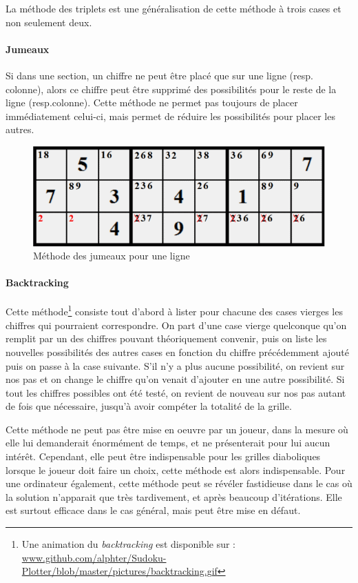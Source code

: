 \documentclass[12pt,a4paper]{report}
\begin{document}
La méthode des triplets est une généralisation de cette méthode à trois cases et non seulement deux.

\paragraph{Jumeaux} Si dans une section, un chiffre ne peut être placé que sur une ligne (resp. colonne), alors ce chiffre peut être supprimé des possibilités pour le reste de la ligne (resp.colonne). Cette méthode ne permet pas toujours de placer immédiatement celui-ci, mais permet de réduire les possibilités pour placer les autres.
\begin{figure}[!h]
 \center
 \includegraphics[scale=0.6]{../pictures/jumeaux}
 \caption{Méthode des jumeaux pour une ligne}
\end{figure}

\paragraph{Backtracking} Cette méthode\footnote{Une animation du \emph{backtracking} est disponible sur : \url{www.github.com/alphter/Sudoku-Plotter/blob/master/pictures/backtracking.gif}} consiste tout d'abord à lister pour chacune des cases vierges les chiffres qui pourraient correspondre. On part d'une case vierge quelconque qu'on remplit par un des chiffres pouvant théoriquement convenir, puis on liste les nouvelles possibilités des autres cases en fonction du chiffre précédemment ajouté puis on passe à la case suivante. S'il n'y a plus aucune possibilité, on revient sur nos pas et on change le chiffre qu'on venait d'ajouter en une autre possibilité. Si tout les chiffres possibles ont été testé, on revient de nouveau sur nos pas autant de fois que nécessaire, jusqu'à avoir compéter la totalité de la grille. 

Cette méthode ne peut pas être mise en oeuvre par un joueur, dans la mesure où elle lui demanderait énormément de temps, et ne présenterait pour lui aucun intérêt. Cependant, elle peut être indispensable pour les grilles diaboliques lorsque le joueur doit faire un choix, cette méthode est alors indispensable.
Pour une ordinateur également, cette méthode peut se révéler fastidieuse dans le cas où la solution n'apparait que très tardivement, et après beaucoup d'itérations. Elle est surtout efficace dans le cas général, mais peut être mise en défaut.
\end{document}
